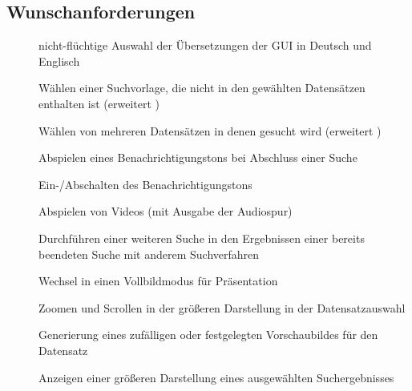\subsection{Wunschanforderungen}
\begin{description}
	\item[] nicht-flüchtige Auswahl der Übersetzungen der GUI in Deutsch und Englisch
	\newline
	\item[] Wählen einer Suchvorlage, die nicht in den gewählten Datensätzen enthalten ist (erweitert )
	\item[] Wählen von mehreren Datensätzen in denen gesucht wird (erweitert )
	\newline
	\item[] Abspielen eines Benachrichtigungstons bei Abschluss einer Suche
	\item[] Ein-/Abschalten des Benachrichtigungstons
	\item[] Abspielen von Videos (mit Ausgabe der Audiospur)
	\item[] Durchführen einer weiteren Suche in den Ergebnissen einer bereits beendeten Suche mit anderem Suchverfahren 
	\newline
	\item[] Wechsel in einen Vollbildmodus für Präsentation
	
	\item[] Zoomen und Scrollen in der größeren Darstellung in der Datensatzauswahl
	\item[] Generierung eines zufälligen oder festgelegten Vorschaubildes für den Datensatz
	\item[] Anzeigen einer größeren Darstellung eines ausgewählten Suchergebnisses
\end{description}
\pagebreak
